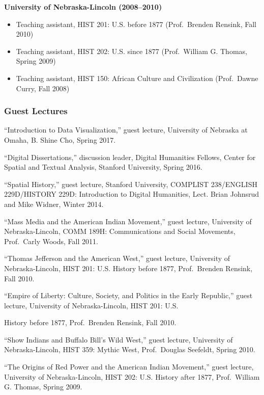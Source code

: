 \textbf{University of Nebraska-Lincoln (2008--2010)}

\begin{itemize}
\tightlist
\item
  Teaching assistant, HIST 201: U.S. before 1877 (Prof.~Brenden Rensink,
  Fall 2010)
\item
  Teaching assistant, HIST 202: U.S. since 1877 (Prof.~William G.
  Thomas, Spring 2009)
\item
  Teaching assistant, HIST 150: African Culture and Civilization
  (Prof.~Dawne Curry, Fall 2008)
\end{itemize}

\subsubsection{Guest Lectures}\label{guest-lectures}

``Introduction to Data Visualization,'' guest lecture, University of
Nebraska at Omaha, B. Shine Cho, Spring 2017.

``Digital Dissertations,'' discussion leader, Digital Humanities
Fellows, Center for Spatial and Textual Analysis, Stanford University,
Spring 2016.

``Spatial History,'' guest lecture, Stanford University, COMPLIST
238/ENGLISH 229D/HISTORY 229D: Introduction to Digital Humanities, Lect.
Brian Johnsrud and Mike Widner, Winter 2014.

``Mass Media and the American Indian Movement,'' guest lecture,
University of Nebraska-Lincoln, COMM 189H: Communications and Social
Movements, Prof.~Carly Woods, Fall 2011.

``Thomas Jefferson and the American West,'' guest lecture, University of
Nebraska-Lincoln, HIST 201: U.S. History before 1877, Prof.~Brenden
Rensink, Fall 2010.

``Empire of Liberty: Culture, Society, and Politics in the Early
Republic,'' guest lecture, University of Nebraska-Lincoln, HIST 201:
U.S.

History before 1877, Prof.~Brenden Rensink, Fall 2010.

``Show Indians and Buffalo Bill's Wild West,'' guest lecture, University
of Nebraska-Lincoln, HIST 359: Mythic West, Prof.~Douglas Seefeldt,
Spring 2010.

``The Origins of Red Power and the American Indian Movement,'' guest
lecture, University of Nebraska-Lincoln, HIST 202: U.S. History after
1877, Prof.~William G. Thomas, Spring 2009.

